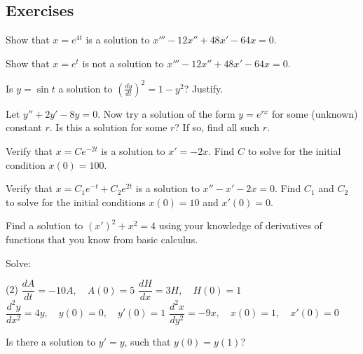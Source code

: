 \subsection{Exercises}

\begin{exercise}
Show that $x = e^{4t}$ is a solution to $x'''-12 x'' + 48 x' - 64 x = 0$.
\end{exercise}

\begin{exercise}
Show that $x = e^{t}$ is not a solution to $x'''-12 x'' + 48 x' - 64 x = 0$.
\end{exercise}

\begin{exercise}
Is $y = \sin t$ a solution to ${\left( \frac{dy}{dt} \right)}^2 = 1 - y^2$?
Justify.
\end{exercise}

\begin{exercise}
Let $y'' + 2y' - 8y = 0$.  Now try a solution of the form $y = e^{rx}$ for
some (unknown) constant $r$.  Is this a solution
for some $r$?  If so, find all such $r$.
\end{exercise}

\begin{exercise}
Verify that $x = C e^{-2t}$ is a solution to $x' = -2x$.
Find $C$ to solve for the initial condition $x(0) = 100$.
\end{exercise}

\begin{exercise}
Verify that $x = C_1 e^{-t} + C_2 e^{2t}$ is a solution to $x'' - x' -2 x =
0$.  Find $C_1$ and $C_2$ to solve for the initial conditions $x(0) = 10$
and $x'(0) = 0$.
\end{exercise}

\begin{exercise}
Find a solution to
${(x')}^2 + x^2 = 4$
using your knowledge of derivatives of functions that you
know from basic calculus.
\end{exercise}

\begin{exercise}
Solve:
\begin{tasks}(2)
\task $\dfrac{dA}{dt} = -10 A, \quad A(0)=5$
\task $\dfrac{dH}{dx} = 3 H, \quad H(0)=1$
\task $\dfrac{d^2y}{dx^2} = 4 y, \quad y(0)=0, \quad y'(0)=1$
\task $\dfrac{d^2x}{dy^2} = -9 x, \quad x(0)=1, \quad x'(0)=0$
\end{tasks}
\end{exercise}

\begin{exercise}
Is there a solution to $y' = y$, such that $y(0) = y(1)$?
\end{exercise}

